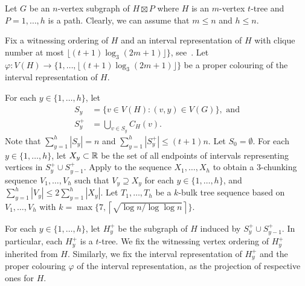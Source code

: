 \documentclass[kpfonts]{patmorin}
\let\le\leqslant
\let\leq\leqslant
\begin{document}

Let $G$ be an $n$-vertex subgraph of $H\boxtimes P$ where $H$ is an $m$-vertex $t$-tree and $P=1,\ldots,h$ is a path. 
Clearly, we can assume that $m\leq n$ and $h\leq n$.

Fix a witnessing ordering of $H$ and 
an interval representation of $H$ with clique number at most $\lfloor(t+1)\log_3 (2m+1)\rfloor\}$, see~. 
Let $\varphi:V(H)\to\{1,\ldots,\lfloor(t+1)\log_3 (2m+1)\rfloor\}$ be a proper colouring of the interval representation of $H$.

For each $y\in\{1,\ldots,h\}$, let 
\begin{align*}
S_y&=\{v\in V(H): (v,y)\in V(G)\}, \text{ and}\\
S^+_y&=\textstyle\bigcup_{v\in S_y} C_H(v).
\end{align*}
Note that $\sum_{y=1}^h |S_y| =n$ and $\sum_{y=1}^h |S^+_y| \leq (t+1)n$.
Let $S_0=\emptyset$. 
For each $y\in\{1,\ldots,h\}$, let $X_y\subset\mathbb{R}$ be the set of all endpoints of intervals representing vertices in $S^+_y\cup S^+_{y-1}$. 
Apply  to the sequence $X_1,\ldots,X_h$ to obtain a $3$-chunking sequence $V_1,\ldots,V_{h}$ such that $V_y\supseteq X_y$ for each $y\in\{1,\ldots,h\}$, and $\sum_{y=1}^h |V_y|\le 2\sum_{y=1}^h |X_y|$.
Let $T_1,\ldots,T_h$ be a $k$-bulk tree sequence based on $V_1,\ldots,V_{h}$ with $k=\max\{7,\left\lceil\sqrt{\log n / \log\log n}\right\rceil\}$.

For each $y\in\{1,\ldots,h\}$, let $H^+_y$ be the subgraph of $H$ induced by $S^+_y\cup S^+_{y-1}$. 
In particular, each $H^+_y$ is a $t$-tree. 
We fix the witnessing vertex ordering of $H^+_y$ inherited from $H$.
Similarly, we fix the interval representation of $H^+_y$ and the proper colouring $\varphi$ of the interval representation, as the projection of respective ones for $H$.
\end{document}
